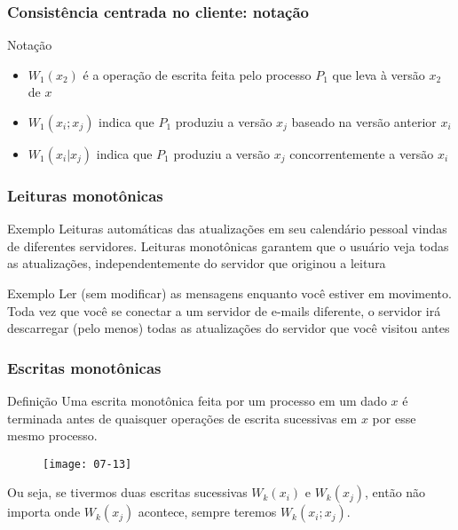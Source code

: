 \documentclass[Ligatures=TeX,table,brazil,svgnames,usetotalslideindicator,compress,10pt]{beamer}
\begin{document}
\begin{frame}
  \frametitle{Consistência centrada no cliente: notação}
  \begin{block}{Notação}
    \begin{itemize}
    \item $W_1(x_2)$ é a operação de escrita feita pelo processo $P_1$ que leva à versão $x_2$ de $x$
    \item $W_1(x_i;x_j)$ indica que $P_1$ produziu a versão $x_j$ baseado na versão anterior $x_i$
    \item $W_1(x_i|x_j)$ indica que $P_1$ produziu a versão $x_j$ \alert{concorrentemente} a versão $x_i$
    \end{itemize}
  \end{block}
\end{frame}

\begin{frame}
  \frametitle{Leituras monotônicas}
  \begin{exampleblock}{Exemplo}
    Leituras automáticas das atualizações em seu calendário pessoal vindas de diferentes servidores. Leituras monotônicas garantem que o usuário veja todas as atualizações, independentemente do servidor que originou a leitura
  \end{exampleblock}

  \pause
  \begin{exampleblock}{Exemplo}
    Ler (sem modificar) as mensagens enquanto você estiver em movimento. Toda vez que você se conectar a um servidor de e-mails diferente, o servidor irá descarregar (pelo menos) todas as atualizações do servidor que você visitou antes
  \end{exampleblock}

\end{frame}

\begin{frame}
  \frametitle{Escritas monotônicas}
  \begin{block}{Definição}
    Uma escrita monotônica feita por um processo em um dado
    $x$ é terminada antes de quaisquer operações de escrita sucessivas
    em $x$ por esse mesmo processo.
  \end{block}

  \begin{figure}
    \centering
    \texttt{[image: 07-13]}
  \end{figure}

  Ou seja, se tivermos duas escritas sucessivas $W_k(x_i)$ e $W_k(x_j)$, então não importa onde $W_k(x_j)$ acontece, sempre teremos $W_k(x_i;x_j)$.

\end{frame}
\end{document}
